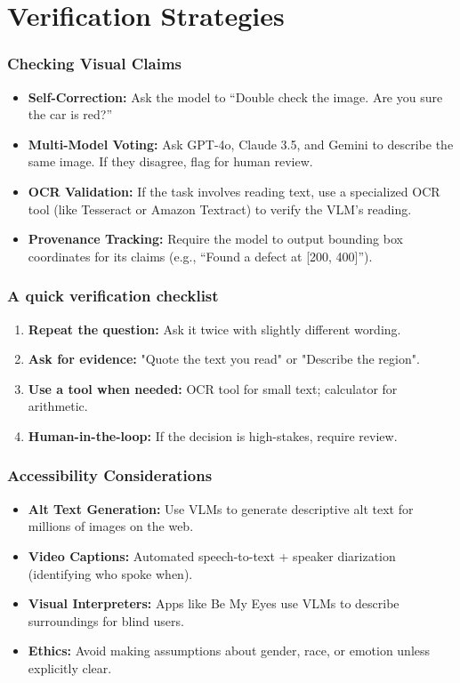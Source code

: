 \documentclass{beamer}
\begin{document}
\section{Verification Strategies}

\begin{frame}
    \frametitle{Checking Visual Claims}
    \begin{itemize}
        \item \textbf{Self-Correction:} Ask the model to ``Double check the image. Are you sure the car is red?''
        \item \textbf{Multi-Model Voting:} Ask GPT-4o, Claude 3.5, and Gemini to describe the same image. If they disagree, flag for human review.
        \item \textbf{OCR Validation:} If the task involves reading text, use a specialized OCR tool (like Tesseract or Amazon Textract) to verify the VLM's reading.
        \item \textbf{Provenance Tracking:} Require the model to output bounding box coordinates for its claims (e.g., ``Found a defect at [200, 400]'').
    \end{itemize}
\end{frame}

\begin{frame}
    \frametitle{A quick verification checklist}
    \begin{enumerate}
        \item \textbf{Repeat the question:} Ask it twice with slightly different wording.
        \item \textbf{Ask for evidence:} "Quote the text you read" or "Describe the region".
        \item \textbf{Use a tool when needed:} OCR tool for small text; calculator for arithmetic.
        \item \textbf{Human-in-the-loop:} If the decision is high-stakes, require review.
    \end{enumerate}
\end{frame}

\begin{frame}
    \frametitle{Accessibility Considerations}
    \begin{itemize}
        \item \textbf{Alt Text Generation:} Use VLMs to generate descriptive alt text for millions of images on the web.
        \item \textbf{Video Captions:} Automated speech-to-text + speaker diarization (identifying who spoke when).
        \item \textbf{Visual Interpreters:} Apps like Be My Eyes use VLMs to describe surroundings for blind users.
        \item \textbf{Ethics:} Avoid making assumptions about gender, race, or emotion unless explicitly clear.
    \end{itemize}
\end{frame}
\end{document}
